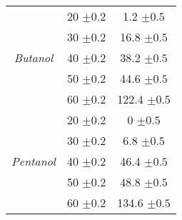 \begin{table}[H]
\begin{tabular}{ccc}
    \midrule
    \multirow{5}[10]{*}{\textit{Butanol}} & 20 $\pm 0.2$    & 1.2 $\pm 0.5$ \\
\cmidrule{2-3}          & 30 $\pm 0.2$    & 16.8 $\pm 0.5$ \\
\cmidrule{2-3}          & 40 $\pm 0.2$    & 38.2 $\pm 0.5$ \\
\cmidrule{2-3}          & 50 $\pm 0.2$    & 44.6 $\pm 0.5$ \\
\cmidrule{2-3}          & 60 $\pm 0.2$    & 122.4 $\pm 0.5$ \\
    \midrule
    \multirow{5}[10]{*}{\textit{Pentanol}} & 20 $\pm 0.2$    & 0 $\pm 0.5$ \\
\cmidrule{2-3}          & 30 $\pm 0.2$    & 6.8 $\pm 0.5$ \\
\cmidrule{2-3}          & 40 $\pm 0.2$    & 46.4 $\pm 0.5$ \\
\cmidrule{2-3}          & 50 $\pm 0.2$    & 48.8 $\pm 0.5$ \\
\cmidrule{2-3}          & 60 $\pm 0.2$    & 134.6 $\pm 0.5$ \\
    \bottomrule
    \end{tabular}%
  \label{tab:addlabel}%
\end{table}%

